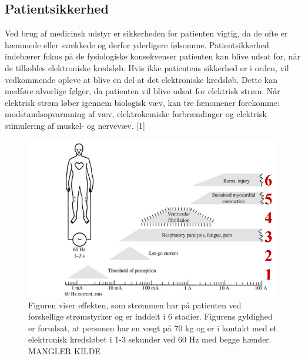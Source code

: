 \subsection{Patientsikkerhed}
Ved brug af medicinsk udstyr er sikkerheden for patienten vigtig, da de ofte er hæmmede eller svækkede og derfor yderligere følsomme. Patientsikkerhed indebærer fokus på de fysiologiske konsekvenser patienten kan blive udsat for, når de tilkobles elektroniske kredsløb. Hvis ikke patientens sikkerhed er i orden, vil vedkommende opleve at blive en del at det elektroniske kredsløb. Dette kan medføre alvorlige følger, da patienten vil blive udsat for elektrisk strøm. Når elektrisk strøm løber igennem biologisk væv, kan tre fænomener forekomme: modstandsopvarmning af væv, elektrokemiske forbrændinger og elektrisk stimulering af muskel- og nervevæv. [1] 
\begin{figure}[H]
	\centering
	\includegraphics[scale=0.5]{figures/bProblemanalyse/Patientsikkerhed.png}
	\caption{Figuren viser effekten, som strømmen har på patienten ved forskellige strømstyrker og er inddelt i 6 stadier. Figurens gyldighed er forudsat, at personen har en vægt på 70 kg og er i kontakt med et elektronisk kredsløbet i 1-3 sekunder ved 60 Hz med begge hænder. MANGLER KILDE}
	\label{Patientsikkerhed}
\end{figure}

